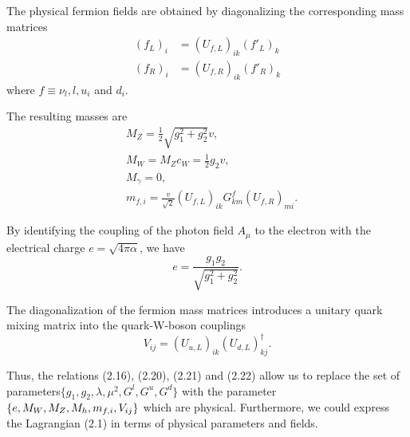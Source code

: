 The physical fermion fields are obtained by diagonalizing the corresponding mass matrices
\begin{align}
(f_L)_i&=(U_{f,L})_{ik}(f'_L)_k\nonumber\\
(f_R)_i&=(U_{f,R})_{ik}(f'_R)_k
\end{align}
where $f\equiv \nu_l,l,u_i$ and $d_i$.

The resulting masses are
\begin{align}
&M_Z=\frac{1}{2}\sqrt{g_1^2+g_2^2} v,\nonumber\\
&M_W=M_Z c_W=\frac{1}{2}g_2 v,\nonumber\\
&M_\gamma=0,\nonumber\\
&m_{f,i}=\frac{v}{\sqrt{2}}(U_{f,L})_{ik} G^f_{km} (U_{f,R})_{mi}.
\end{align}

By identifying the coupling of the photon field $A_\mu$ to the electron with the electrical charge $e=\sqrt{4\pi\alpha}$, we have 
\begin{equation}
e=\frac{g_1g_2}{\sqrt{g_1^2+g_2^2}}.
\end{equation}

The diagonalization of the fermion mass matrices introduces a unitary quark mixing matrix into the quark-W-boson couplings
\begin{equation}
V_{ij}=(U_{u,L})_{ik}(U_{d,L})_{kj}^\dagger.
\end{equation}

Thus, the relations (2.16), (2.20), (2.21) and (2.22) allow us to replace the set of parameters$\{g_1, g_2, \lambda, \mu^2, G^l, G^u, G^d\}$ with the parameter $\{e, M_W, M_Z, M_h, \newline m_{f,i} , V_{ij} \}$ which are physical. Furthermore, we could express the Lagrangian (2.1) in terms of physical parameters and fields. 

